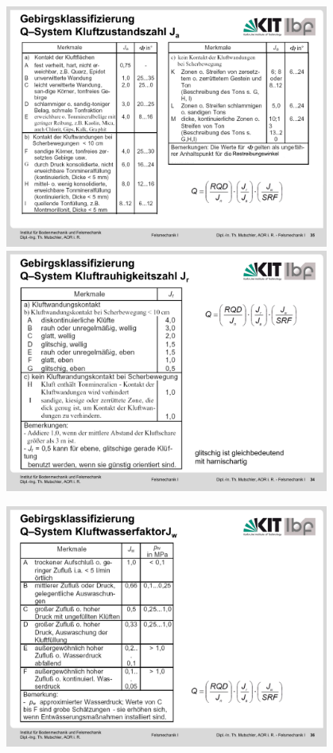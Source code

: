 \documentclass[fleqn,twoside]{article}
\begin{document}
\begin{minipage}{0.5\textwidth}
\includegraphics[width=0.8\textwidth]{Grafiken/J_ab.pdf}
\includegraphics[width=0.8\textwidth]{Grafiken/J_r.pdf}
\end{minipage}
\begin{minipage}{0.5\textwidth}
    \includegraphics[width=0.8\textwidth]{Grafiken/J_w.pdf}
\end{minipage}
\end{document}
